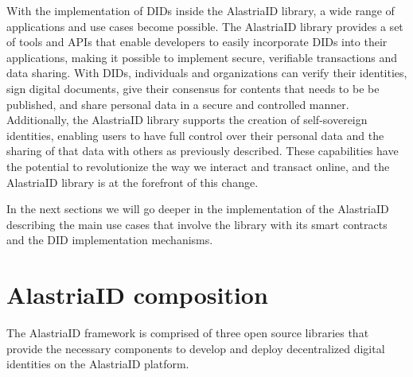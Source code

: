 \documentclass[target=mst,aauheader=]{thud}
\begin{document}
With the implementation of DIDs inside the AlastriaID library, a wide range of applications and use cases become possible. The AlastriaID library provides a set of tools and APIs that enable developers to easily incorporate DIDs into their applications, making it possible to implement secure, verifiable transactions and data sharing. With DIDs, individuals and organizations can verify their identities, sign digital documents, give their consensus for contents that needs to be be published, and share personal data in a secure and controlled manner. Additionally, the AlastriaID library supports the creation of self-sovereign identities, enabling users to have full control over their personal data and the sharing of that data with others as previously described. These capabilities have the potential to revolutionize the way we interact and transact online, and the AlastriaID library is at the forefront of this change.\par
In the next sections we will go deeper in the implementation of the AlastriaID describing the main use cases that involve the library with its smart contracts and the DID implementation mechanisms.

\section{AlastriaID composition}

The AlastriaID framework is comprised of three open source libraries that provide the necessary components to develop and deploy decentralized digital identities on the AlastriaID platform.
\end{document}
